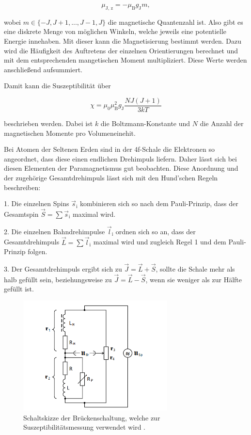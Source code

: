 \begin{equation}
    \label{eqn:mu-z}
    \mu_\text{J, z} = - \mu_\text{B} g_\text{J} m,
\end{equation}

wobei $m \in \{ -J, J+1, ... , J-1, J \}$ die magnetische Quantenzahl ist.
Also gibt es eine diskrete Menge von möglichen Winkeln, welche jeweils eine potentielle Energie innehaben.
Mit dieser kann die Magnetisierung bestimmt werden.
Dazu wird die Häufigkeit des Auftretens der einzelnen Orientierungen berechnet und mit dem entsprechenden mangetischen Moment multipliziert.
Diese Werte werden anschließend aufsummiert.

Damit kann die Suszeptibilität über

\begin{equation}
    \label{eqn:suszep}
    \chi = \mu_0 \mu_\text{B}^2 g_\text{J} \frac{N J (J + 1)}{3 k T}
\end{equation}

beschrieben werden.
Dabei ist $k$ die Boltzmann-Konstante und $N$ die Anzahl der magnetischen Momente pro Volumeneinehit.

Bei Atomen der Seltenen Erden sind in der 4f-Schale die Elektronen so angeordnet, dass diese einen endlichen Drehimpuls liefern.
Daher lässt sich bei diesen Elementen der Paramagnetismus gut beobachten.
Diese Anordnung und der zugehörige Gesamtdrehimpuls lässt sich mit den Hund'schen Regeln beschreiben:

1. Die einzelnen Spins $\vec{s}_\text{i}$ kombinieren sich so nach dem Pauli-Prinzip, dass der Gesamtspin $\vec{S} = \sum \vec{s}_\text{i}$ maximal wird.

2. Die einzelnen Bahndrehimpulse $\vec{l}_\text{i}$ ordnen sich so an, dass der Gesamtdrehimpuls $\vec{L} = \sum \vec{l}_\text{i}$ maximal wird und zugleich Regel 1 und dem Pauli-Prinzip folgen.

3. Der Gesamtdrehimpuls ergibt sich zu $\vec{J} = \vec{L} + \vec{S}$, sollte die Schale mehr als halb gefüllt sein, beziehungsweise zu $\vec{J} = \vec{L} - \vec{S}$, wenn sie weniger als zur Hälfte gefüllt ist.



\begin{figure}
    \centering
    \includegraphics[width=0.70\textwidth]{content/bruecke.png}
    \caption{Schaltskizze der Brückenschaltung, welche zur Suszeptibilitätsmessung verwendet wird \cite{V606}.}
    \label{fig:bruecke}
\end{figure}

